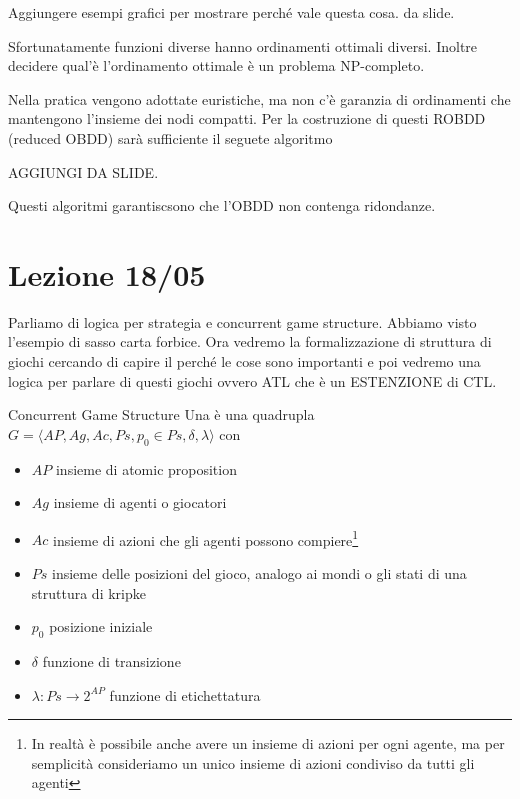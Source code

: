 Aggiungere esempi grafici per mostrare perché vale questa cosa. da slide.

Sfortunatamente funzioni diverse hanno ordinamenti ottimali diversi. Inoltre decidere qual'è l'ordinamento ottimale è un problema NP-completo.

Nella pratica vengono adottate euristiche, ma non c'è garanzia di ordinamenti che mantengono l'insieme dei nodi compatti.
Per la costruzione di questi ROBDD (reduced OBDD) sarà sufficiente il seguete algoritmo

AGGIUNGI DA SLIDE.

Questi algoritmi garantiscsono che l'OBDD non contenga ridondanze.

\chapter{Lezione 18/05}

Parliamo di logica per strategia e concurrent game structure. Abbiamo visto l'esempio di sasso carta forbice. Ora vedremo la formalizzazione di struttura di giochi cercando di capire il perché le cose sono importanti e poi vedremo una logica per parlare di questi giochi ovvero ATL che è un ESTENZIONE di CTL\@.

\begin{definition}{Concurrent Game Structure}
  Una  è una quadrupla \(G=\langle AP, Ag, Ac,Ps, p_0 \in Ps, \delta, \lambda \rangle\) con
\begin{itemize}
  \item \(AP\) insieme di atomic proposition
  \item \(Ag\) insieme di agenti o giocatori
  \item \(Ac\) insieme di azioni che gli agenti possono compiere\footnote{In realtà è possibile anche avere un insieme di azioni per ogni agente, ma per semplicità consideriamo un unico insieme di azioni condiviso da tutti gli agenti}
  \item \(Ps\) insieme delle posizioni del gioco, analogo ai mondi o gli stati di una struttura di kripke
  \item \(p_0\) posizione iniziale
  \item \(\delta\) funzione di transizione
  \item \(\lambda: Ps \to 2^{AP}\) funzione di etichettatura
\end{itemize}

\end{definition}

